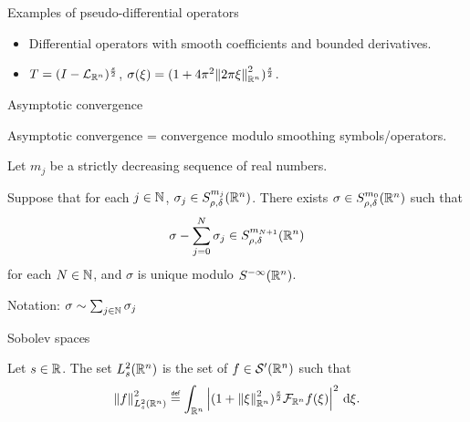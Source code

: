 \documentclass{beamer}
\begin{document}
\begin{frame}
    {Examples of pseudo-differential operators}

    \begin{itemize}
        \item Differential operators with smooth coefficients and bounded derivatives.
        \item $T = \BesselPotential s$, $\sigma(\xi) = (1 + 4 \pi^2 \norm [\R^n] {\turn \xi}^2)^{\frac s 2}$.
    \end{itemize}
\end{frame}

\begin{frame}
    {Asymptotic convergence}

    Asymptotic convergence = convergence modulo smoothing symbols/operators.
    \pause
    \begin{theorem}
        Let $m_j$ be a strictly decreasing sequence of real numbers.

        Suppose that for each $j \in \N$, $\sigma_j \in \SymbolClass {m_j} {\rho, \delta}$.
        There exists $\sigma \in \SymbolClass {m_0} {\rho, \delta}$ such that \begin{align*}
            \sigma - \sum_{j = 0}^{N} \sigma_j \in \SymbolClass {m_{N + 1}} {\rho, \delta}
        \end{align*}
        for each $N \in \N$,
        and $\sigma$ is unique modulo $\SmoothingSymbols$.
    \end{theorem}

    \pause
    Notation: $\sigma \sim \sum_{j \in \N} \sigma_j$
\end{frame}

\begin{frame}
    {Sobolev spaces}

    \begin{definition}
        Let $s \in \R$.
        The set $\Sobolev s$ is the set of $f \in \TemperedDistributions \Group$ such that
        \begin{align*}
            \norm [\Sobolev s] f^2
            \defeq \int_{\R^n} \abs{(1 + \norm [\R^n] \xi^2)^\frac s 2 \Fourier f(\xi)}^2 \dd \xi.
        \end{align*}
    \end{definition}
\end{frame}
\end{document}
